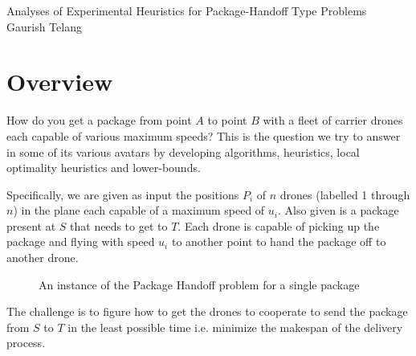 \documentclass[12.0pt]{report}
\begin{document}
\begin{titlepage}
	\centering
        {\Huge Analyses of Experimental Heuristics for Package-Handoff Type Problems\\}
        \vspace{20mm}
        {\Large Gaurish Telang}
\end{titlepage}
\setcounter{page}{2} 
\setcounter{tocdepth}{1}
\tableofcontents
{}

\chapter{Overview}

How do you get a package from point $A$ to point $B$ with a fleet of carrier drones each 
capable of various maximum speeds? This is the question we try to answer in some of  
its various avatars by developing algorithms, heuristics, local optimality heuristics 
and lower-bounds. 

Specifically, we are given as input the positions $P_i$ of $n$ drones (labelled 1 through $n$) 
in the plane each capable of a maximum speed of $u_i$. Also given is a package present 
at $S$ that needs to get to $T$. Each drone is capable of picking up the package and 
flying with speed $u_i$ to another point to hand the package off to another drone. 

\begin{figure}[H]
    \centering
    \qquad
    \caption{An instance of the Package Handoff problem for a single package}%
    \label{single-pho-example}%
\end{figure}


The challenge is to figure how to get the drones to cooperate to send 
the package from $S$ to $T$ in the least possible time i.e. minimize the makespan
of the delivery process. 
\end{document}
